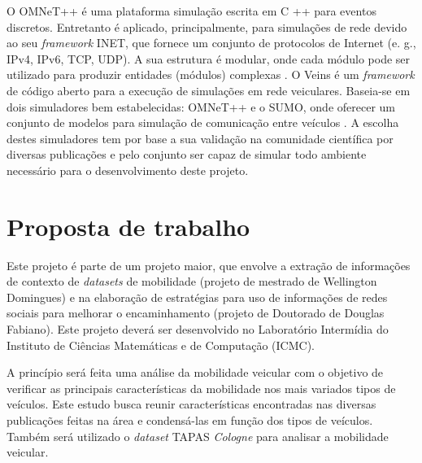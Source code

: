 \documentclass[mestrado, pre-defesa, english, brazil]{packages/icmc}
\begin{document}
O OMNeT++ é uma plataforma simulação escrita em C ++ para eventos discretos. Entretanto é aplicado, principalmente, para simulações de rede devido ao seu \textit{framework} INET, que fornece um conjunto de protocolos de Internet (e. g., IPv4, IPv6, TCP, UDP). A sua estrutura é modular, onde cada módulo pode ser utilizado para produzir entidades (módulos) complexas \cite{OMNeT++-2014}. O Veins é um \textit{framework} de código aberto para a execução de simulações em rede veiculares. Baseia-se em dois simuladores bem estabelecidas: OMNeT++ e o SUMO, onde oferecer um conjunto de modelos para simulação de comunicação entre veículos \cite{Veins-2014}. A escolha destes simuladores tem por base a sua validação na comunidade científica por diversas publicações e pelo conjunto ser capaz de simular todo ambiente necessário para o desenvolvimento deste projeto.


\section{Proposta de trabalho}

Este projeto é parte de um projeto maior, que envolve a extração de informações de contexto de \textit{datasets} de mobilidade (projeto de mestrado de Wellington Domingues) e na elaboração de estratégias para uso de informações de redes sociais para melhorar o encaminhamento (projeto de Doutorado de Douglas Fabiano). Este projeto deverá ser desenvolvido no Laboratório Intermídia do Instituto de Ciências Matemáticas e de Computação (ICMC).

A princípio será feita uma análise da mobilidade veicular com o objetivo de verificar as principais características da mobilidade nos mais variados tipos de veículos. Este estudo busca reunir características encontradas nas diversas publicações feitas na área e condensá-las em função dos tipos de veículos. Também será utilizado o \textit{dataset} TAPAS \textit{Cologne} para analisar a mobilidade veicular.
\end{document}
